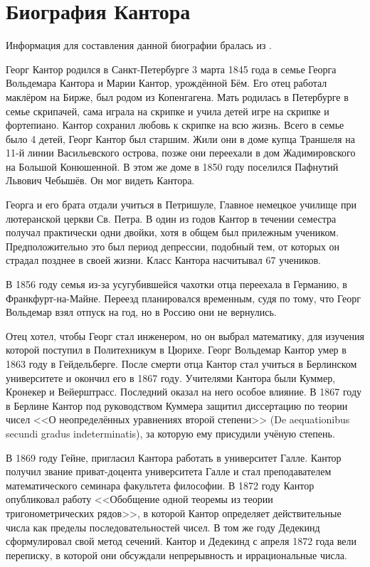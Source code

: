 \documentclass[a4paper,12pt]{extarticle}
\theoremstyle{definition}
\begin{document}
\section{Биография Кантора}
Информация для составления данной биографии бралась из \cite{bio}.

Георг Кантор родился в Санкт-Петербурге 3 марта 1845 года в семье Георга Вольдемара Кантора и Марии Кантор, урождённой Бём.
Его отец работал маклёром на Бирже, был родом из Копенгагена.
Мать родилась в Петербурге в семье скрипачей, сама играла на скрипке и учила детей игре на скрипке и фортепиано.
Кантор сохранил любовь к скрипке на всю жизнь.
Всего в семье было 4 детей, Георг Кантор был старшим.
Жили они в доме купца Траншеля на 11-й линии Васильевского острова, позже они переехали в дом Жадимировского на Большой Конюшенной.
В этом же доме в 1850 году поселился Пафнутий Львович Чебышёв.
Он мог видеть Кантора.

Георга и его брата отдали учиться в Петришуле, Главное немецкое училище при лютеранской церкви Св. Петра.
В один из годов Кантор в течении семестра получал практически одни двойки, хотя в общем был прилежным учеником.
Предположительно это был период депрессии, подобный тем, от которых он страдал позднее в своей жизни.
Класс Кантора насчитывал 67 учеников.

В 1856 году семья из-за усугубившейся чахотки отца переехала в Германию, в Франкфурт-на-Майне.
Переезд планировался временным, судя по тому, что Георг Вольдемар взял отпуск на год, но в Россию они не вернулись.

Отец хотел, чтобы Георг стал инженером, но он выбрал математику, для изучения которой поступил в Политехникум в Цюрихе.
Георг Вольдемар Кантор умер в 1863 году в Гейдельберге.
После смерти отца Кантор стал учиться в Берлинском университете и окончил его в 1867 году.
Учителями Кантора были Куммер, Кронекер и Вейерштрасс.
Последний оказал на него особое влияние.
В 1867 году в Берлине Кантор под руководством Куммера защитил диссертацию по теории чисел
<<О неопределённых уравнениях второй степени>> (De aequationibus secundi gradus indeterminatis), за которую ему присудили учёную степень.

В 1869 году Гейне, пригласил Кантора работать в университет Галле. Кантор получил звание приват-доцента университета Галле и стал преподавателем математического семинара факультета философии.
В 1872 году Кантор опубликовал работу <<Обобщение одной теоремы из теории тригонометрических рядов>>, в которой Кантор определяет действительные числа как пределы последовательностей чисел.
В том же году Дедекинд сформулировал свой метод сечений.
Кантор и Дедекинд с апреля 1872 года вели переписку, в которой они обсуждали непрерывность и иррациональные числа.
\end{document}
